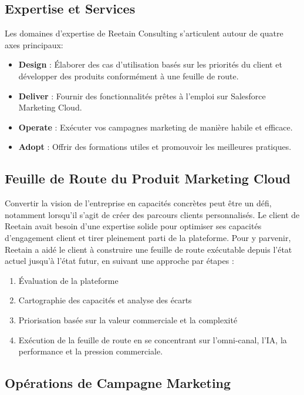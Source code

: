 \subsection{Expertise et Services}

Les domaines d'expertise de Reetain Consulting s'articulent autour de quatre axes principaux:

\begin{itemize}
    \item \textbf{Design} : Élaborer des cas d'utilisation basés sur les priorités du client et développer des produits conformément à une feuille de route.
    \item \textbf{Deliver} : Fournir des fonctionnalités prêtes à l'emploi sur Salesforce Marketing Cloud.
    \item \textbf{Operate} : Exécuter vos campagnes marketing de manière habile et efficace.
    \item \textbf{Adopt} : Offrir des formations utiles et promouvoir les meilleures pratiques.
\end{itemize}

\subsection{Feuille de Route du Produit Marketing Cloud}

Convertir la vision de l'entreprise en capacités concrètes peut être un défi, notamment lorsqu'il s'agit de créer des parcours clients personnalisés. Le client de Reetain avait besoin d'une expertise solide pour optimiser ses capacités d'engagement client et tirer pleinement parti de la plateforme. Pour y parvenir, Reetain a aidé le client à construire une feuille de route exécutable depuis l'état actuel jusqu'à l'état futur, en suivant une approche par étapes :

\begin{enumerate}
    \item Évaluation de la plateforme
    \item Cartographie des capacités et analyse des écarts
    \item Priorisation basée sur la valeur commerciale et la complexité
    \item Exécution de la feuille de route en se concentrant sur l'omni-canal, l'IA, la performance et la pression commerciale.
\end{enumerate}

\subsection{Opérations de Campagne Marketing}

